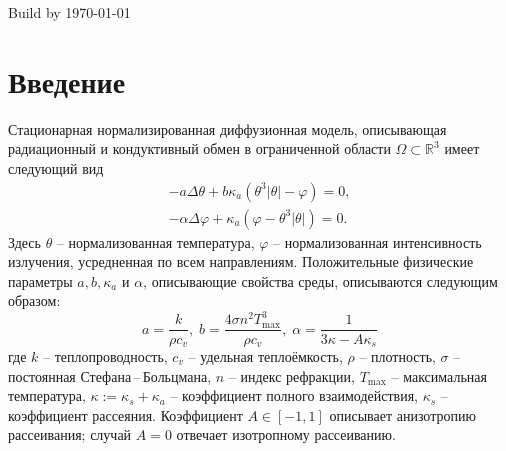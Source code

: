 \documentclass[10pt]{article}
\begin{document}
    Build by \today
    \section{Введение}\label{sec:intro}
    Стационарная нормализированная диффузионная модель, описывающая радиационный и кондуктивный
    обмен в ограниченной области $\Omega \subset \mathbb{R}^3$ имеет следующий вид~\cite{modest-rht}
    \begin{equation}
        \label{initial}
        \begin{aligned}
            - a \Delta \theta + b \kappa_a(\theta ^ 3 | \theta | - \varphi) = 0,  \\
            - \alpha \Delta \varphi + \kappa_a (\varphi - \theta ^3 | \theta |) = 0.
        \end{aligned}
    \end{equation}
    Здесь $\theta$ – нормализованная температура,
    $\varphi$ – нормализованная интенсивность излучения, усредненная по всем направлениям.
    Положительные физические параметры $a, b, \kappa_a $ и $\alpha$,
    описывающие свойства среды, описываются следующим образом:
    \[
        a = \frac{k}{\rho c_v}, \; b = \frac{4 \sigma n^2 T^3_{\text{max}}}{\rho c_v}, \;
        \alpha = \frac{1}{3\kappa -A \kappa_s}
    \]
    где $k$ -- теплопроводность, $c_v$ -- удельная теплоёмкость, $\rho$ -- плотность,
    $\sigma$ -- постоянная Стефана\,--\,Больцмана, $n$ -- индекс рефракции,
    $T_{\text{max}}$ -- максимальная температура, $\kappa := \kappa_s + \kappa_a$ -- коэффициент
    полного взаимодействия, $\kappa_s$ -- коэффициент рассеяния.
    Коэффициент $A \in [-1,1]$ описывает анизотропию рассеивания;
    случай $A=0$ отвечает изотропному рассеиванию.
\end{document}
